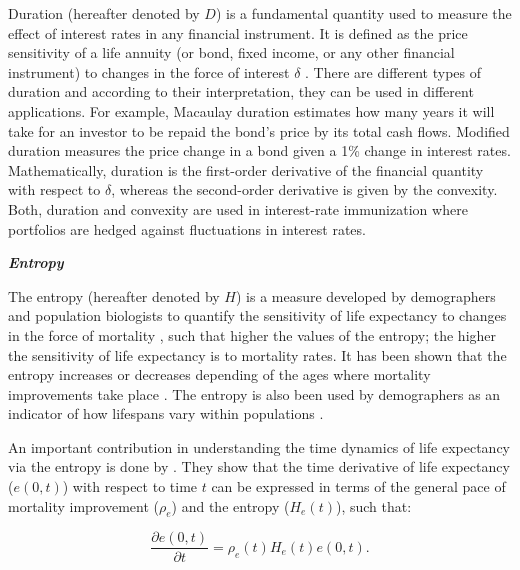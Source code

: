 \documentclass[12pt]{article}
\begin{document}
 Duration (hereafter denoted by $D$) is a fundamental quantity used to measure the effect of interest rates in any financial instrument. It is defined as the price sensitivity of a life annuity (or bond, fixed income, or any other financial instrument) to changes in the force of interest $\delta$ \citep{milevsky2013life,charupat2016sluggish}. There are different types of duration and according to their interpretation, they can be used in different applications. For example, Macaulay duration estimates how many years it will take for an investor to be repaid the bond's price by its total cash flows. Modified duration measures the price change in a bond given a 1\% change in interest rates. Mathematically, duration is the first-order derivative of the financial quantity with respect to $\delta$, whereas the second-order derivative is given by the convexity. Both, duration and convexity are used in interest-rate immunization \citep{redington1951papers,fisher1971coping,shiu1990redington,santomero1997financial,courtois2007immunization} where portfolios are hedged against fluctuations in interest rates.


\textit{\textbf{Entropy}}


The entropy (hereafter denoted by $H$) is a measure developed by demographers and population biologists to quantify the sensitivity of life expectancy to changes in the force of mortality \citep{leser1955variations,keyfitz1977difference,demetrius1974demographic,goldman1986new,Vaupel1986}, such that higher the values of the entropy; the higher the sensitivity of life expectancy is to mortality rates. It has been shown that the entropy increases or decreases depending of the ages where mortality improvements take place \citep{aburto2019threshold}. The entropy is also been used by demographers as an indicator of how lifespans vary within populations \citep{vaupel2011life,fernandez2015entropy,aburto2020dynamics}.

An important contribution in understanding the time dynamics of life expectancy via the entropy is done by \citet{Vaupel2003}. They show that the time derivative of life expectancy ($e(0,t)$) with respect to time $t$ can be expressed in terms of the general pace of mortality improvement ($\rho_{e}$) and the entropy ($H_{e}(t)$), such that:

\begin{equation}\label{eq:lifeexpdecomp}
	\dfrac{\partial e(0,t)}{\partial t}= \rho_{e}(t)H_{e}(t)e(0,t).
\end{equation}
\end{document}
